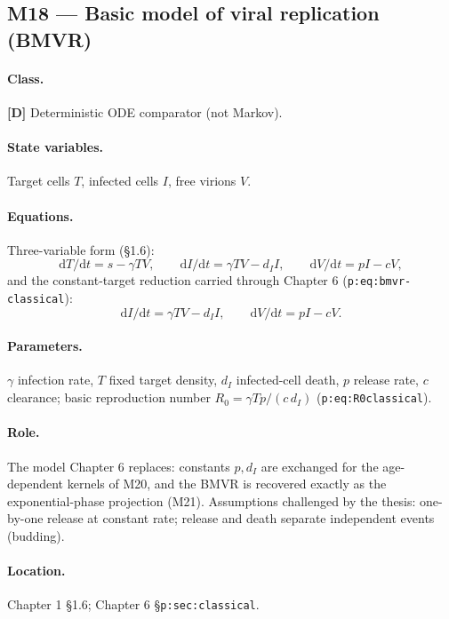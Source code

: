 \documentclass[11pt,a4paper]{article}
\newcommand{\dd}{\mathrm{d}}
\begin{document}
\subsection{M18 --- Basic model of viral replication (BMVR) \quad [D]}

\paragraph{Class.} \textbf{[D]} Deterministic ODE comparator (not Markov).

\paragraph{State variables.} Target cells $T$, infected cells $I$, free
virions $V$.

\paragraph{Equations.} Three-variable form (\S1.6):
\[
\dd T/\dd t=s-\gamma TV,\qquad
\dd I/\dd t=\gamma TV-d_II,\qquad
\dd V/\dd t=pI-cV,
\]
and the constant-target reduction carried through Chapter 6
(\texttt{p:eq:bmvr-classical}):
\[
\dd I/\dd t=\gamma TV-d_II,\qquad \dd V/\dd t=pI-cV .
\]

\paragraph{Parameters.} $\gamma$ infection rate, $T$ fixed target density,
$d_I$ infected-cell death, $p$ release rate, $c$ clearance; basic
reproduction number $R_0=\gamma Tp/(c\,d_I)$ (\texttt{p:eq:R0classical}).

\paragraph{Role.} The model Chapter 6 replaces: constants $p,d_I$ are
exchanged for the age-dependent kernels of M20, and the BMVR is recovered
exactly as the exponential-phase projection (M21). Assumptions challenged
by the thesis: one-by-one release at constant rate; release and death
separate independent events (budding).

\paragraph{Location.} Chapter 1 \S1.6; Chapter 6
\S\texttt{p:sec:classical}.
\end{document}
